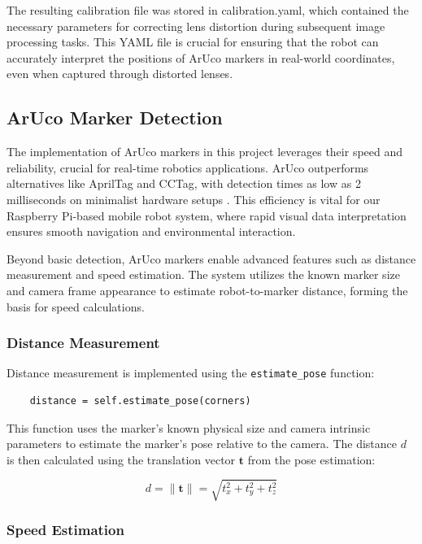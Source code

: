 The resulting calibration file was stored in calibration.yaml, which contained the necessary parameters for correcting lens distortion during subsequent image processing tasks. This YAML file is crucial for ensuring that the robot can accurately interpret the positions of ArUco markers in real-world coordinates, even when captured through distorted lenses.


\subsection{ArUco Marker Detection}

The implementation of ArUco markers in this project leverages their speed and reliability, crucial for real-time robotics applications. ArUco outperforms alternatives like AprilTag and CCTag, with detection times as low as 2 milliseconds on minimalist hardware setups \cite{patru2023empirical}. This efficiency is vital for our Raspberry Pi-based mobile robot system, where rapid visual data interpretation ensures smooth navigation and environmental interaction.

Beyond basic detection, ArUco markers enable advanced features such as distance measurement and speed estimation. The system utilizes the known marker size and camera frame appearance to estimate robot-to-marker distance, forming the basis for speed calculations.

\subsubsection{Distance Measurement}

Distance measurement is implemented using the \texttt{estimate\_pose} function:

\begin{verbatim}
	distance = self.estimate_pose(corners)
\end{verbatim}

This function uses the marker's known physical size and camera intrinsic parameters to estimate the marker's pose relative to the camera. The distance \(d\) is then calculated using the translation vector \(\mathbf{t}\) from the pose estimation:

\[
d = \|\mathbf{t}\| = \sqrt{t_x^2 + t_y^2 + t_z^2}
\]

\subsubsection{Speed Estimation}

